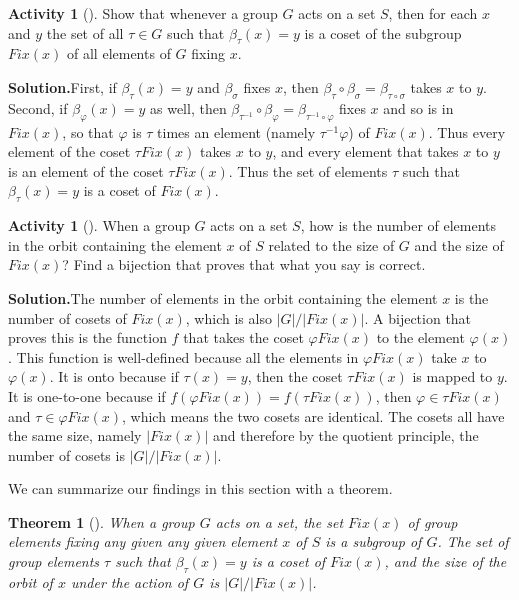 \documentclass[10pt,]{book}
\theoremstyle{plain}
\newtheorem{theorem}{Theorem}[section]
\theoremstyle{definition}
\newtheorem{activity}[project]{Activity}
\numberwithin{equation}{chapter}
\begin{document}
\begin{activity}[]\label{activity-287}
Show that whenever a group \(G\) acts on a set \(S\), then for each \(x\) and \(y\) the set of all \(\tau \in G\) such that \(\beta_{\tau}(x) = y\) is a coset of the subgroup \({ Fix}(x)\) of all elements of \(G\) fixing \(x\).%
\par\medskip\noindent%
\textbf{Solution.}\quad First, if \(\beta_{\tau}(x)=y\) and \(\beta_{\sigma}\) fixes \(x\), then \(\beta_{\tau}\circ \beta_{\sigma}=\beta_{\tau\circ\sigma}\) takes \(x\) to \(y\). Second, if \(\beta_{\varphi}(x)=y\) as well, then \(\beta_{\tau^{-1}}\circ\beta_{\varphi}=\beta_{\tau^{-1}\circ\varphi}\) fixes \(x\) and so is in \({ Fix}(x)\), so that \(\varphi\) is \(\tau\) times an element (namely \(\tau^{-1}\varphi\)) of \({ Fix}(x)\). Thus every element of the coset \(\tau{ Fix}(x)\) takes \(x\) to \(y\), and every element that takes \(x\) to \(y\) is an element of the coset \(\tau{
Fix}(x)\). Thus the set of elements \(\tau\) such that \(\beta_{\tau}(x)=y\) is a coset of \({ Fix}(x)\).%
\end{activity}
\begin{activity}[]\label{activity-288}
When a group \(G\) acts on a set \(S\), how is the number of elements in the orbit containing the element \(x\) of \(S\) related to the size of \(G\) and the size of \({ Fix}(x)\)? Find a bijection that proves that what you say is correct.%
\par\medskip\noindent%
\textbf{Solution.}\quad The number of elements in the orbit containing the element \(x\) is the number of cosets of \({ Fix}(x)\), which is also \(|G|/|{ Fix}(x)|\). A bijection that proves this is the function \(f\) that takes the coset \(\varphi{ Fix}(x)\) to the element \(\varphi(x)\). This function is well-defined because all the elements in \(\varphi{
Fix}(x)\) take \(x\) to \(\varphi(x)\). It is onto because if \(\tau(x) =y\), then the coset \(\tau{ Fix}(x)\) is mapped to \(y\). It is one-to-one because if \(f(\varphi{ Fix}(x))=f(\tau{ Fix}(x))\), then \(\varphi\in \tau{ Fix}(x)\) and \(\tau \in \varphi{ Fix}(x)\), which means the two cosets are identical. The cosets all have the same size, namely \(|{ Fix}(x)|\) and therefore by the quotient principle, the number of cosets is \(|G|/|{ Fix}(x)|\).%
\end{activity}
We can summarize our findings in this section with a theorem.%
\begin{theorem}[{}]\label{theorem-8}
When a group \(G\) acts on a set, the set \({ Fix}(x)\) of group elements fixing any given any given element \(x\) of \(S\) is a subgroup of \(G\). The set of group elements \(\tau\) such that \(\beta_{\tau}(x) = y\) is a coset of \({ Fix}(x)\), and the size of the orbit of \(x\) under the action of \(G\) is \(|G|/|{ Fix}(x)|\).%
\end{theorem}
\typeout{************************************************}
\typeout{************************************************}
\end{document}
